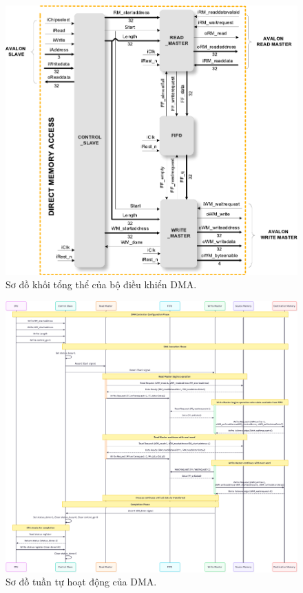 \begin{figure}[htbp]
    \centering
    \includegraphics[width=\linewidth]{Images/02_09_DMABlockDiagram}
    \caption{Sơ đồ khối tổng thể của bộ điều khiển DMA.}
    \label{fig:02_09_DMA_BlockDiagram}
\end{figure}

\begin{figure}[htbp]
    \centering
    \includegraphics[width=\linewidth]{Images/02_10_SystemSequenceDiagram}
    \caption{Sơ đồ tuần tự hoạt động của DMA.}
    \label{fig:dma_flowchart_pdf}
\end{figure}

